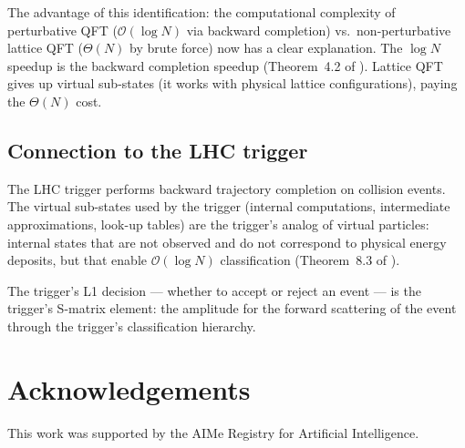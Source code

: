 \documentclass[twocolumn,10pt,a4paper]{article}
\theoremstyle{thmstyle}
\theoremstyle{definition}
\theoremstyle{remark}
\begin{document}
The advantage of this identification: the computational complexity of
perturbative QFT ($\mathcal{O}(\log N)$ via backward completion) vs.\
non-perturbative lattice QFT ($\Theta(N)$ by brute force) now has a
clear explanation. The $\log N$ speedup is the backward completion speedup
(Theorem~4.2 of \citealt{companion:trajectory}). Lattice QFT gives up
virtual sub-states (it works with physical lattice configurations),
paying the $\Theta(N)$ cost.

\subsection{Connection to the LHC trigger}

The LHC trigger performs backward trajectory completion on collision
events. The virtual sub-states used by the trigger (internal computations,
intermediate approximations, look-up tables) are the trigger's analog
of virtual particles: internal states that are not observed and do not
correspond to physical energy deposits, but that enable $\mathcal{O}(\log N)$
classification (Theorem~8.3 of \citealt{companion:trajectory}).

The trigger's L1 decision --- whether to accept or reject an event ---
is the trigger's S-matrix element: the amplitude for the forward scattering
of the event through the trigger's classification hierarchy.

\section*{Acknowledgements}
This work was supported by the AIMe Registry for Artificial Intelligence.



\end{document}
